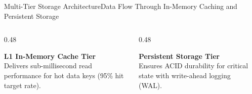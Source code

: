 \documentclass[aspectratio=169, 10pt]{beamer}
\begin{document}
\begin{frame}{Multi-Tier Storage Architecture}{Data Flow Through In-Memory Caching and Persistent Storage}
  \vspace*{-0.15cm}
  \begin{columns}[T]
    \begin{column}{0.48\textwidth}
      \begin{tcolorbox}[nordicaccent]
        {\color{NordicBlue}\bfseries L1 In-Memory Cache Tier}\\[2pt]
        {\scriptsize Delivers sub-millisecond read performance for hot data keys (95\% hit target rate).}
      \end{tcolorbox}
    \end{column}
    \begin{column}{0.48\textwidth}
      \begin{tcolorbox}[nordictealbox]
        {\color{NordicTeal}\bfseries Persistent Storage Tier}\\[2pt]
        {\scriptsize Ensures ACID durability for critical state with write-ahead logging (WAL).}
      \end{tcolorbox}
    \end{column}
  \end{columns}
\end{frame}
\end{document}
